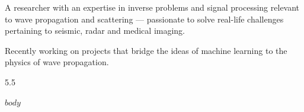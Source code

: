 \documentclass[9pt]{developercv} %
\begin{document}
\vspace{0.5cm}



\begin{minipage}[t]{0.4\textwidth} %
	\vspace{\baselineskip} %
A researcher 
with an expertise in inverse problems and 
signal processing relevant to wave propagation and 
scattering --- passionate to solve real-life challenges pertaining to seismic, radar and medical imaging. 

Recently working on projects that bridge 
	the ideas of machine learning to the physics of wave propagation.
\end{minipage}
\hfill %
\begin{minipage}[t]{0.5\textwidth} %
	\vspace{-\baselineskip} %
	\begin{barchart}{5.5}
	\end{barchart}
\end{minipage}

\begin{center}
\end{center}

$body$
\end{document}
